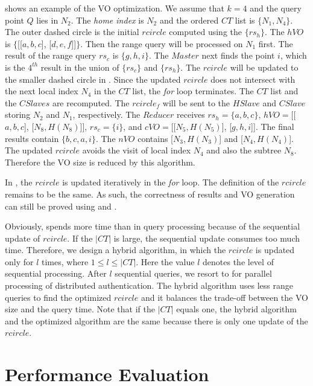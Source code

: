 shows an example of the VO optimization. We assume that $k=4$ and the query point $Q$ lies in $N_{2}$. The \emph{home index} is $N_{2}$ and the ordered $CT$ list is $\{N_{1}, N_{4}\}$. The outer dashed circle is the initial $rcircle$ computed using the $\{rs_{h}\}$. The $hVO$ is $\{$[[$a, b, c$], [$d, e, f$]]$\}$. Then the range query will be processed on $N_{1}$ first. The result of the range query $rs_{c}$ is $\{g, h, i\}$. The $Master$ next finds the point $i$, which is the $4^{th}$ result in the union of $\{rs_{c}\}$ and $\{rs_{h}\}$. The $rcircle$ will be updated to the smaller dashed circle in . Since the updated $rcircle$ does not intersect with the next local index $N_{4}$ in the $CT$ list, the \emph{for} loop terminates. The $CT$ list and the $CSlaves$ are recomputed. The $rcircle_{f}$ will be sent to the $HSlave$ and $CSlave$ storing $N_{2}$ and $N_{1}$, respectively. The $Reducer$ receives $rs_{h} = \{a, b, c\}$, $hVO= $[[$a, b, c$], [$N_{8}, H(N_{8})$]], $rs_{c} = \{i\}$, and $cVO =$[[$N_{5}, H(N_{5})$], [$g, h, i$]]. The final results contain $\{b, c, a, i\}$. The $nVO$ contains [$N_{3}, H(N_{3})$] and [$N_{4}, H(N_{4})$]. The updated $rcircle$ avoids the visit of local index $N_{4}$ and also the subtree $N_{8}$. Therefore the VO size is reduced by this algorithm.

In , the $rcircle$ is updated iteratively in the \emph{for} loop. The definition of the $rcircle$ remains to be the same. As such, the correctness of results and VO generation can still be proved using  and .

Obviously,  spends more time than  in query processing because of the sequential update of $rcircle$. If the $|CT|$ is large, the sequential update consumes too much time. Therefore, we design a hybrid algorithm, in which the $rcircle$ is updated only for $l$ times, where $1\le l \le |CT|$. Here the value $l$ denotes the level of sequential processing. After $l$ sequential queries, we resort to  for parallel processing of distributed authentication. The hybrid algorithm uses less range queries to find the optimized $rcircle$ and it balances the trade-off between the VO size and the query time. Note that if the $|CT|$ equals one, the hybrid algorithm and the optimized algorithm are the same because there is only one update of the $rcircle$.

\section{Performance Evaluation}\label{sec:knn:exp}


